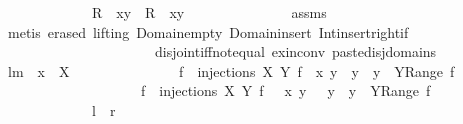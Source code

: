 \begin{isabellebody}
\ \ \ \ \ \ \ \ \ \ \ \ \ {\isachardoublequoteopen}R\ {\isacharplus}{\isacharasterisk}\ {\isacharbraceleft}{\isacharparenleft}x{\isacharcomma}y{\isacharparenright}{\isacharbraceright}\ {\isacharequal}\ R\ {\isasymunion}\ {\isacharbraceleft}{\isacharparenleft}x{\isacharcomma}y{\isacharparenright}{\isacharbraceright}{\isachardoublequoteclose}\ \isanewline
%
\isadelimproof
\ \ \ \ \ \ \ \ \ \ \ \ %
\endisadelimproof
%
\isatagproof
{}\isamarkupfalse%
\ assms\isanewline
\ \ \ \ \ \ \ \ \ \ \ \ \isamarkupfalse%
\ {\isacharparenleft}metis\ {\isacharparenleft}erased{\isacharcomma}\ lifting{\isacharparenright}\ Domain{\isacharunderscore}empty\ Domain{\isacharunderscore}insert\ Int{\isacharunderscore}insert{\isacharunderscore}right{\isacharunderscore}if{}\isanewline
\ \ \ \ \ \ \ \ \ \ \ \ \ \ \ \ \ \ \ \ \ \ disjoint{\isacharunderscore}iff{\isacharunderscore}not{\isacharunderscore}equal\ ex{\isacharunderscore}in{\isacharunderscore}conv\ paste{\isacharunderscore}disj{\isacharunderscore}domains{\isacharparenright}%
\endisatagproof
{\isafoldproof}%
%
\isadelimproof
\isanewline
%
\endisadelimproof
\isanewline
\isanewline
{}\isamarkupfalse%
\ lm{}{}{\isacharcolon}\ \ {\isachardoublequoteopen}x\ {\isasymnotin}\ X{\isachardoublequoteclose}\ \isanewline
\ \ \ \ \ \ \ \ \ \ \ \ \ {\isachardoublequoteopen}{\isacharparenleft}{\isasymUnion}\ f\ {\isasymin}\ injections\ X\ Y{\isachardot}\ {\isacharbraceleft}f\ {\isacharplus}{\isacharasterisk}\ {\isacharbraceleft}{\isacharparenleft}x{\isacharcomma}\ y{\isacharparenright}{\isacharbraceright}\ {\isacharbar}\ y\ {\isachardot}\ y\ {\isasymin}\ Y{\isacharminus}Range\ f{\isacharbraceright}{\isacharparenright}\ {\isacharequal}\ \isanewline
\ \ \ \ \ \ \ \ \ \ \ \ \ \ \ \ \ \ \ {\isacharparenleft}{\isasymUnion}\ f\ {\isasymin}\ injections\ X\ Y{\isachardot}\ {\isacharbraceleft}f\ {\isasymunion}\ \ {\isacharbraceleft}{\isacharparenleft}x{\isacharcomma}\ y{\isacharparenright}{\isacharbraceright}\ \ {\isacharbar}\ y\ {\isachardot}\ y\ {\isasymin}\ Y{\isacharminus}Range\ f{\isacharbraceright}{\isacharparenright}{\isachardoublequoteclose}\ \isanewline
\ \ \ \ \ \ \ \ \ \ \ \ {\isacharparenleft}\ {\isachardoublequoteopen}{\isacharquery}l\ {\isacharequal}\ {\isacharquery}r{\isachardoublequoteclose}{\isacharparenright}\ \isanewline
%
\isadelimproof
%
\endisadelimproof
%
\isatagproof
{}\isamarkupfalse%
\ {\isacharminus}\ \isanewline
\ \ \isamarkupfalse%
\ \isanewline

\end{isabellebody}
